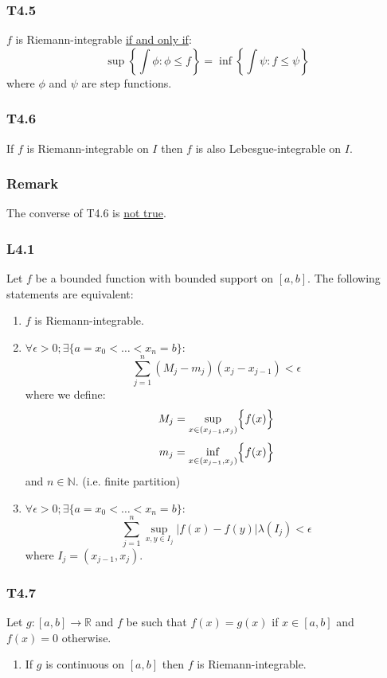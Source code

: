 \documentclass{article}
\begin{document}
\begin{multicols*}{3}
\subsubsection*{T4.5}
$f$ is Riemann-integrable \underline{if and only if}:
$$\sup\left\{\int\phi:\phi\leq f\right\}
=\inf\left\{\int\psi:f\leq\psi\right\}$$
where $\phi$ and $\psi$ are step functions.

\subsubsection*{T4.6}
If $f$ is Riemann-integrable on $I$ then
$f$ is also Lebesgue-integrable on $I$.

\subsubsection*{Remark}
The converse of T4.6 is \underline{not true}.

\subsubsection*{L4.1}
Let $f$ be a bounded function with
bounded support on $[a,b]$.
The following statements are equivalent:
\begin{enumerate}
    \item $f$ is Riemann-integrable.

    \item $\forall\epsilon>0;
    \exists\{a=x_0<\dots<x_n=b\}:$
    $$\sum_{j=1}^{n}(M_j-m_j)(x_j-x_{j-1})<\epsilon$$
    where we define:
    $$M_j=\sup_{x\in(x_{j-1},x_j)}\Bigl\{f(x)\Bigr\}$$
    $$m_j=\inf_{x\in(x_{j-1},x_j)}\Bigl\{f(x)\Bigr\}$$
    and $n\in\mathbb{N}$.
    (i.e. finite partition)

    \item $\forall\epsilon>0;
    \exists\{a=x_0<\dots<x_n=b\}:$
    $$\sum_{j=1}^{n}\sup_{x,y\in I_j}
    |f(x)-f(y)|\lambda(I_j)<\epsilon$$
    where $I_j=(x_{j-1},x_j)$.
\end{enumerate}

\subsubsection*{T4.7}
Let $g:[a,b]\rightarrow\mathbb{R}$
and $f$ be such that $f(x)=g(x)$ if $x\in[a,b]$
and $f(x)=0$ otherwise.
\begin{enumerate}
    \item If $g$ is continuous on $[a,b]$
    then $f$ is Riemann-integrable.


\end{enumerate}
\end{multicols*}
\end{document}
